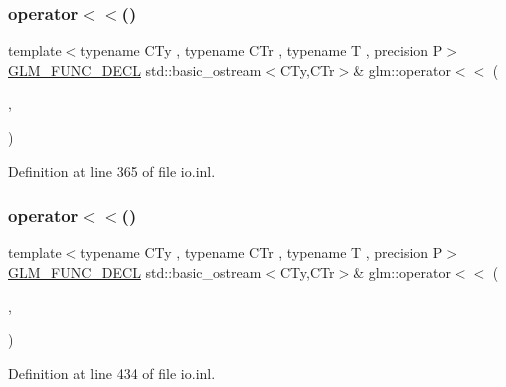 \subsubsection{\texorpdfstring{operator$<$$<$()}{operator<<()}\hspace{0.1cm}{\footnotesize\ttfamily [14/15]}}
{\footnotesize\ttfamily template$<$typename C\+Ty , typename C\+Tr , typename T , precision P$>$ \\
\mbox{\hyperlink{setup_8hpp_ab2d052de21a70539923e9bcbf6e83a51}{G\+L\+M\+\_\+\+F\+U\+N\+C\+\_\+\+D\+E\+CL}} std\+::basic\+\_\+ostream$<$C\+Ty,C\+Tr$>$\& glm\+::operator$<$$<$ (\begin{DoxyParamCaption}\item[{std\+::basic\+\_\+ostream$<$ C\+Ty, C\+Tr $>$ \&}]{,  }\item[{\mbox{\hyperlink{structglm_1_1tmat4x4}{tmat4x4}}$<$ T, P $>$ const \&}]{ }\end{DoxyParamCaption})}



Definition at line 365 of file io.\+inl.

\mbox{\label{group__gtx__io_ga67ab2a9a13c872bd33e6a0455c97ce9c}} 
\subsubsection{\texorpdfstring{operator$<$$<$()}{operator<<()}\hspace{0.1cm}{\footnotesize\ttfamily [15/15]}}
{\footnotesize\ttfamily template$<$typename C\+Ty , typename C\+Tr , typename T , precision P$>$ \\
\mbox{\hyperlink{setup_8hpp_ab2d052de21a70539923e9bcbf6e83a51}{G\+L\+M\+\_\+\+F\+U\+N\+C\+\_\+\+D\+E\+CL}} std\+::basic\+\_\+ostream$<$C\+Ty,C\+Tr$>$\& glm\+::operator$<$$<$ (\begin{DoxyParamCaption}\item[{std\+::basic\+\_\+ostream$<$ C\+Ty, C\+Tr $>$ \&}]{,  }\item[{std\+::pair$<$ \mbox{\hyperlink{structglm_1_1tmat4x4}{tmat4x4}}$<$ T, P $>$ const, \mbox{\hyperlink{structglm_1_1tmat4x4}{tmat4x4}}$<$ T, P $>$ const $>$ const \&}]{ }\end{DoxyParamCaption})}



Definition at line 434 of file io.\+inl.

